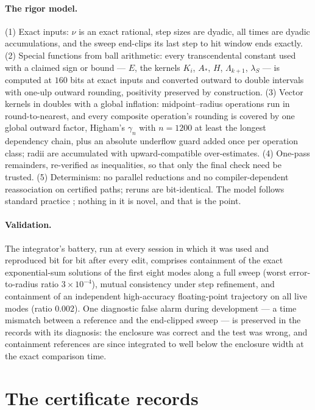 \documentclass[11pt,a4paper]{article}
\theoremstyle{plain}
\theoremstyle{definition}
\begin{document}
\paragraph{The rigor model.} (1) Exact inputs: $\nu$ is an exact rational, step sizes are dyadic, all times are dyadic accumulations, and the sweep end-clips its last step to hit window ends exactly. (2) Special functions from ball arithmetic: every transcendental constant used with a claimed sign or bound --- $E$, the kernels $K_i$, $A_*$, $H$, $\Lambda_{k+1}$, $\lambda_S$ --- is computed at $160$ bits at exact inputs and converted outward to double intervals with one-ulp outward rounding, positivity preserved by construction. (3) Vector kernels in doubles with a global inflation: midpoint--radius operations run in round-to-nearest, and every composite operation's rounding is covered by one global outward factor, Higham's $\gamma_n$ with $n=1200$ at least the longest dependency chain, plus an absolute underflow guard added once per operation class; radii are accumulated with upward-compatible over-estimates. (4) One-pass remainders, re-verified as inequalities, so that only the final check need be trusted. (5) Determinism: no parallel reductions and no compiler-dependent reassociation on certified paths; reruns are bit-identical. The model follows standard practice \cite{Hig02,Rum10,Joh17}; nothing in it is novel, and that is the point.

\paragraph{Validation.} The integrator's battery, run at every session in which it was used and reproduced bit for bit after every edit, comprises containment of the exact exponential-sum solutions of the first eight modes along a full sweep (worst error-to-radius ratio $3\times10^{-4}$), mutual consistency under step refinement, and containment of an independent high-accuracy floating-point trajectory on all live modes (ratio $0.002$). One diagnostic false alarm during development --- a time mismatch between a reference and the end-clipped sweep --- is preserved in the records with its diagnosis: the enclosure was correct and the test was wrong, and containment references are since integrated to well below the enclosure width at the exact comparison time.

\section{The certificate records}\label{app:D}
\end{document}
